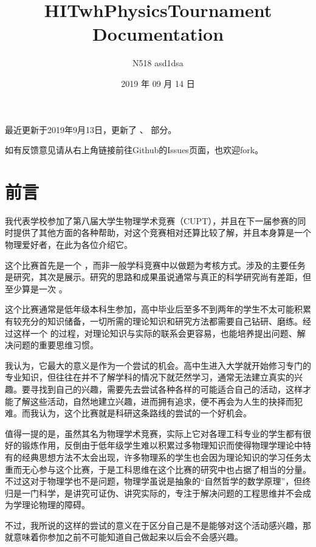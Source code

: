 \documentclass[a4paper,10pt,english]{sphinxmanual}
\title{HITwhPhysicsTournament Documentation}
\date{2019 年 09 月 14 日}
\author{N518 asd1dsa}
\begin{document}
\maketitle
\sphinxtableofcontents
{}\label{\detokenize{index::doc}}


最近更新于2019年9月13日，更新了  、  部分。

如有反馈意见请从右上角链接前往Github的Issues页面，也欢迎fork。


\chapter{前言}
\label{\detokenize{1. Preface::doc}}\label{\detokenize{1. Preface:id1}}
我代表学校参加了第八届大学生物理学术竞赛（CUPT），并且在下一届参赛的同时提供了其他方面的各种帮助，对这个竞赛相对还算比较了解，并且本身算是一个物理爱好者，在此为各位介绍它。

这个比赛首先是一个  ，而非一般学科竞赛中以做题为考核方式。涉及的主要任务是研究，其次是展示。研究的思路和成果虽说通常与真正的科学研究尚有差距，但至少算是一次  。

这个比赛通常是低年级本科生参加，高中毕业后至多不到两年的学生不太可能积累有较充分的知识储备，一切所需的理论知识和研究方法都需要自己钻研、磨练。经过这样一个  的过程，对理论知识与实际的联系会更容易，也能培养提出问题、解决问题的重要思维习惯。

我认为，它最大的意义是作为一个尝试的机会。高中生进入大学就开始修习专门的专业知识，但往往在并不了解学科的情况下就茫然学习，通常无法建立真实的兴趣。要寻找到自己的兴趣，需要先去尝试各种各样的可能适合自己的活动，这样才能了解这些活动，自然地建立兴趣，进而拥有追求，便不再会为人生的抉择而犯难。而我认为，这个比赛就是科研这条路线的尝试的一个好机会。

值得一提的是，虽然其名为物理学术竞赛，实际上它对各理工科专业的学生都有很好的锻炼作用，反倒由于低年级学生难以积累过多物理知识而使得物理学理论中特有的经典思想方法不太会出现，许多物理系的学生也会因为理论知识的学习任务太重而无心参与这个比赛，于是工科思维在这个比赛的研究中也占据了相当的分量。不过这对于物理学也不是问题，物理学虽说是抽象的“自然哲学的数学原理”，但终归是一门科学，是讲究可证伪、讲究实际的，专注于解决问题的工程思维并不会成为学理论物理的障碍。

不过，我所说的这样的尝试的意义在于区分自己是不是能够对这个活动感兴趣，那就意味着你参加之前不可能知道自己做起来以后会不会感兴趣。
\end{document}
